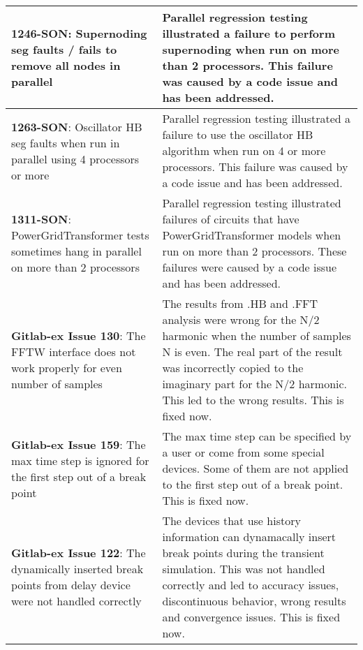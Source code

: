 {\begin{longtable}[h] {>{\raggedright\small}m{2in}|>{\raggedright\let\\\tabularnewline\small}m{3.5in}}
\textbf{1246-SON}: Supernoding seg faults / fails to remove all nodes in parallel &
Parallel regression testing illustrated a failure to perform supernoding when run on more than 2
processors.  This failure was caused by a code issue and has been addressed. 
\\ \hline

\textbf{1263-SON}: Oscillator HB seg faults when run in parallel using 4 processors or more &
Parallel regression testing illustrated a failure to use the oscillator HB algorithm when run on 
4 or more processors.  This failure was caused by a code issue and has been addressed. 
\\ \hline

\textbf{1311-SON}: PowerGridTransformer tests sometimes hang in parallel on more than 2 processors &
Parallel regression testing illustrated failures of circuits that have PowerGridTransformer
models when run on more than 2 processors.  These failures were caused by a code issue and has been
addressed.
\\ \hline

\textbf{Gitlab-ex Issue 130}: The FFTW interface does not work properly for even number of samples  &
The results from .HB and .FFT analysis were wrong for the N/2 harmonic when the number of samples N
is even. The real part of the result was incorrectly copied to the imaginary part for the N/2 harmonic.
This led to the wrong results. This is fixed now.
\\ \hline


\textbf{Gitlab-ex Issue 159}: The max time step is ignored for the first step out of a break point &
The max time step can be specified by a user or come from some special devices. Some of them are not
applied to the first step out of a break point. This is fixed now.
\\ \hline

\textbf{Gitlab-ex Issue 122}: The dynamically inserted break points from delay device were not handled correctly &
The devices that use history information can dynamacally insert break points during the transient simulation. This
was not handled correctly and led to accuracy issues, discontinuous behavior, wrong results and convergence issues.
This is fixed now.
\\ \hline


\end{longtable}
}
